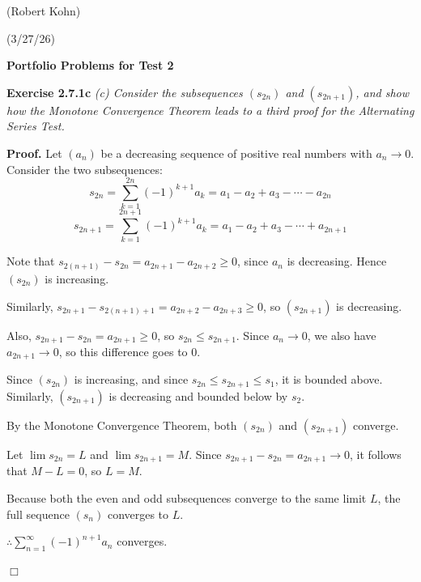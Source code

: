 \documentclass[reqno,11pt]{amsart}
\begin{document}
\begin{flushright} (Robert Kohn) \end{flushright}
\begin{flushright} (3/27/26)\end{flushright}
\vspace{0.2in}
\begin{center}
{\bf Portfolio Problems for Test 2}
\vspace{0.2in}
\end{center}

\noindent\textbf{Exercise 2.7.1c}  
\textit{(c) Consider the subsequences \( (s_{2n}) \) and \( (s_{2n+1}) \), and show how the Monotone Convergence Theorem leads to a third proof for the Alternating Series Test.}
\medskip

\noindent\textbf{Proof.}
Let \((a_n)\) be a decreasing sequence of positive real numbers with \(a_n \to 0\).
Consider the two subsequences:
\[
s_{2n} = \sum_{k=1}^{2n} (-1)^{k+1} a_k = a_1 - a_2 + a_3 - \cdots - a_{2n}
\]
\[
s_{2n+1} = \sum_{k=1}^{2n+1} (-1)^{k+1} a_k = a_1 - a_2 + a_3 - \cdots + a_{2n+1}
\]

Note that \( s_{2(n+1)} - s_{2n} = a_{2n+1} - a_{2n+2} \ge 0 \), since \(a_n\) is decreasing. Hence \( (s_{2n}) \) is increasing.

Similarly, \( s_{2n+1} - s_{2(n+1)+1} = a_{2n+2} - a_{2n+3} \ge 0 \), so \( (s_{2n+1}) \) is decreasing.

Also, \( s_{2n+1} - s_{2n} = a_{2n+1} \ge 0 \), so \( s_{2n} \le s_{2n+1} \). Since \( a_n \to 0 \), we also have \( a_{2n+1} \to 0 \), so this difference goes to 0.

Since \( (s_{2n}) \) is increasing, and since \( s_{2n} \le s_{2n+1} \le s_1 \), it is bounded above. Similarly, \( (s_{2n+1}) \) is decreasing and bounded below by \( s_2 \).

By the Monotone Convergence Theorem, both \( (s_{2n}) \) and \( (s_{2n+1}) \) converge.

Let \( \lim s_{2n} = L \) and \( \lim s_{2n+1} = M \). Since \( s_{2n+1} - s_{2n} = a_{2n+1} \to 0 \), it follows that \( M - L = 0 \), so \( L = M \).

Because both the even and odd subsequences converge to the same limit \( L \), the full sequence \( (s_n) \) converges to \( L \).

\(\therefore \sum_{n=1}^{\infty} (-1)^{n+1} a_n\) converges.

\hfill$\Box$

\newpage
\end{document}
